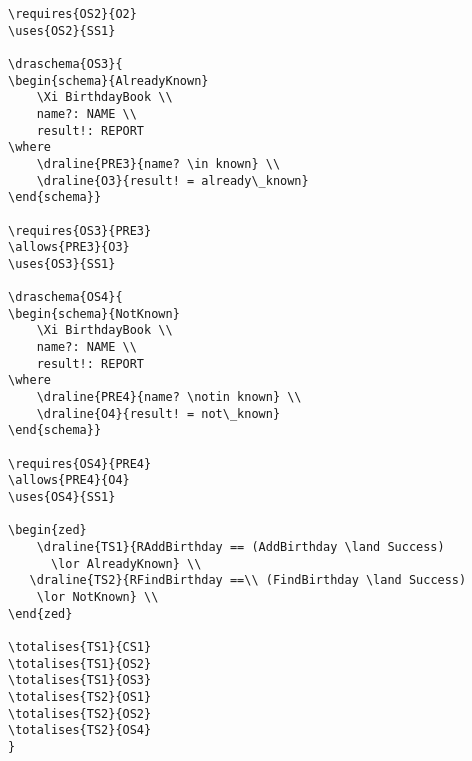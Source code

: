 \begin{verbatim}
\requires{OS2}{O2}
\uses{OS2}{SS1}

\draschema{OS3}{
\begin{schema}{AlreadyKnown}
    \Xi BirthdayBook \\
    name?: NAME \\
    result!: REPORT
\where
    \draline{PRE3}{name? \in known} \\
    \draline{O3}{result! = already\_known}
\end{schema}}

\requires{OS3}{PRE3}
\allows{PRE3}{O3}
\uses{OS3}{SS1}

\draschema{OS4}{
\begin{schema}{NotKnown}
    \Xi BirthdayBook \\
    name?: NAME \\
    result!: REPORT
\where
    \draline{PRE4}{name? \notin known} \\
    \draline{O4}{result! = not\_known}
\end{schema}}

\requires{OS4}{PRE4}
\allows{PRE4}{O4}
\uses{OS4}{SS1}

\begin{zed} 
    \draline{TS1}{RAddBirthday == (AddBirthday \land Success)
      \lor AlreadyKnown} \\
   \draline{TS2}{RFindBirthday ==\\ (FindBirthday \land Success)
    \lor NotKnown} \\
\end{zed}

\totalises{TS1}{CS1}
\totalises{TS1}{OS2}
\totalises{TS1}{OS3}
\totalises{TS2}{OS1}
\totalises{TS2}{OS2}
\totalises{TS2}{OS4}
}


\end{verbatim}